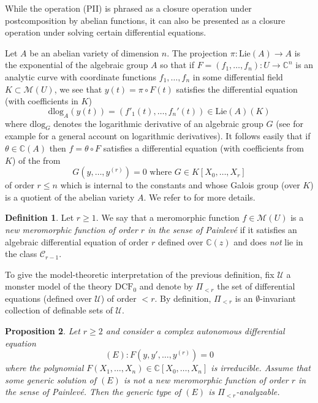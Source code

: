 \documentclass[12pt]{amsart}
\newcommand{\U}{\mathcal{U}}
\theoremstyle{definition}
\newtheorem{definition}{Definition}[subsection]
\theoremstyle{plain}
\newtheorem{proposition}[definition]{Proposition}
\theoremstyle{exampstyle}
\theoremstyle{exampstyle}\newtheorem{thmxbis}{Theorem}
\numberwithin{equation}{section}
\theoremstyle{remark}
\begin{document}
{\remark\label{remarkPII} While the operation (PII) is phrased as a closure operation under postcomposition by abelian functions, it can also be presented as a closure operation under solving certain differential equations. 

Let $A$ be an abelian variety of dimension $n$.  The projection $\pi: \mathrm{Lie}(A) \rightarrow A$ is the exponential of the algebraic group $A$ so that if $F = (f_1,\ldots, f_n) : U \rightarrow \mathbb{C}^n$ is an analytic curve with coordinate functions $f_1,\ldots, f_n$ in some differential field $K \subset \mathcal M(U)$, we see that $y(t) = \pi \circ F(t)$ satisfies the differential equation  (with coefficients in $K$)
$$\mathrm{dlog}_A(y(t)) = (f'_1(t),\ldots, f_n'(t)) \in \mathrm{Lie}(A)(K)$$
where $\mathrm{dlog}_G$ denotes the logarithmic derivative of an algebraic group $G$ (see for example \cite{Pillay-Galois} for a general account on logarithmic derivatives). It follows easily that if $\theta \in \mathbb{C}(A)$ then $f = \theta \circ F$ satisfies a differential equation (with coefficients from $K$) of the from
$$G(y,\ldots, y^{(r)}) = 0 \text{ where } G \in K[X_0,\ldots, X_r]$$ 
of order $r \leq n$ which is internal to the constants and whose Galois group (over $K$) is a quotient of the abelian variety $A$. We refer to \cite{Umemura} for more details.}



\begin{definition} 
Let $r \geq 1$.  We say that a meromorphic function $f \in \mathcal M(U)$  is a {\em new meromorphic function of order $r$ in the sense of Painlevé} if it satisfies an algebraic differential equation of order $r$ defined over $\mathbb{C}(z)$ and does {\em not} lie in the class $\mathcal C_{r-1}$.
\end{definition} 

To give the model-theoretic interpretation of the previous definition, fix $\U$ a monster model of the theory $\mathrm{DCF}_0$ and denote by $\Pi_{< r}$ the set of differential equations (defined over $\U$) of order $< r$. By definition, $\Pi_{<r}$ is an $\emptyset$-invariant collection of definable sets of $\U$. 

\begin{proposition} \label{proposition-Umemura}
Let $r \geq 2$ and consider a complex autonomous differential equation  $$(E): F(y,y',\ldots, y^{(r)}) = 0$$ 
where the polynomial $F(X_1,\ldots, X_n) \in \mathbb{C}[X_0,\ldots, X_n]$ is irreducible. 
Assume that some generic solution of $(E)$ is {\em not} a new meromorphic function of order $r$ in the sense of Painlevé. 
Then the generic type of $(E)$ is $\Pi_{<r}$-analyzable. 
\end{proposition} 
\end{document}
